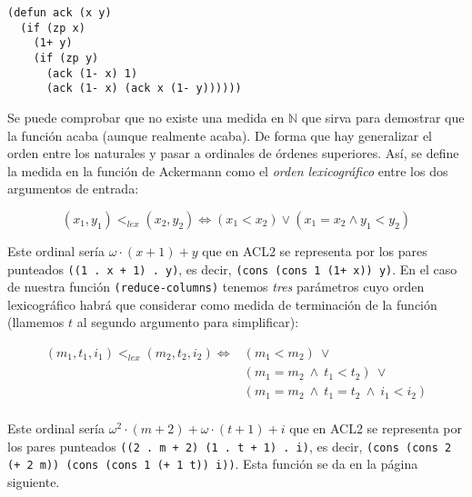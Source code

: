 \documentclass[a4paper,10pt]{article}
\begin{document}
\par \vspace{10pt}

\begin{lstlisting}[language=clips]
(defun ack (x y)
  (if (zp x)
    (1+ y)
    (if (zp y)
      (ack (1- x) 1)
      (ack (1- x) (ack x (1- y))))))
\end{lstlisting}

\par \vspace{10pt}

Se puede comprobar que no existe una medida en $\mathbb{N}$ que sirva para demostrar que la función acaba (aunque realmente acaba). De forma que hay generalizar el orden entre los naturales y pasar a ordinales de órdenes superiores. Así, se define la medida en la función de Ackermann como el \emph{orden lexicográfico} entre los dos argumentos de entrada:

$$
(x_1,y_1) <_{lex} (x_2,y_2) \Longleftrightarrow (x_1 < x_2) \vee (x_1 = x_2 \wedge y_1 < y_2)
$$

\par \vspace{10pt}

Este ordinal sería $\omega \cdot (x + 1) + y$ que en ACL2 se representa por los pares punteados \texttt{((1 . x + 1) . y)}, es decir, \texttt{(cons (cons 1 (1+ x)) y)}. En el caso de nuestra función \texttt{(reduce-columns)} tenemos \emph{tres} parámetros cuyo orden lexicográfico habrá que considerar como medida de terminación de la función (llamemos $t$ al segundo argumento para simplificar):

$$
\begin{array}{rl}
(m_1,t_1,i_1) <_{lex} (m_2,t_2,i_2) \Longleftrightarrow & (m_1 < m_2)\ \vee \\
                                                        & (m_1 = m_2\ \wedge\ t_1 < t_2)\ \vee \\
																												& (m_1 = m_2\ \wedge\ t_1 = t_2\ \wedge\ i_1 < i_2)\\
\end{array}
$$

\par \vspace{10pt}

Este ordinal sería $\omega^2 \cdot (m + 2) + \omega \cdot (t + 1) + i$ que en ACL2 se representa por los pares punteados \texttt{((2 . m + 2) (1 . t + 1) . i)}, es decir, \texttt{(cons (cons 2 (+ 2 m)) (cons (cons 1 (+ 1 t)) i))}. Esta función se da en la página siguiente. 
\end{document}
